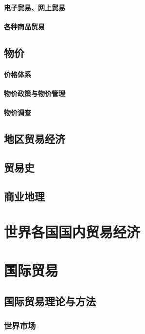 \documentclass[UTF8]{../../RepresentationUniverse}
\begin{document}
    \subsubsection{电子贸易、网上贸易}
    \subsubsection{各种商品贸易}
\section{物价}
    \subsubsection{价格体系}
    \subsubsection{物价政策与物价管理}
    \subsubsection{物价调查}
\section{地区贸易经济}
\section{贸易史}
\section{商业地理}



\chapter{世界各国国内贸易经济}







\chapter{国际贸易}
\section{国际贸易理论与方法}
    \subsection{世界市场}
\end{document}
